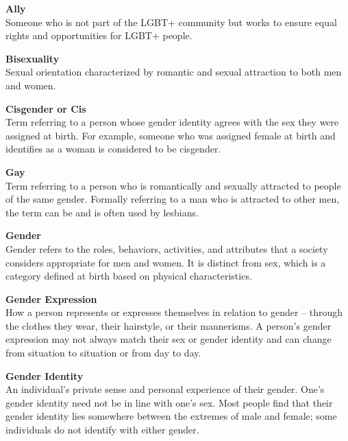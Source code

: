 \begin{titlepage}
\noindent\textbf{Ally}\\
Someone who is not part of the LGBT+ community but works to ensure equal rights and opportunities for LGBT+ people.\vspace*{\baselineskip}


\noindent\textbf{Bisexuality}\\
Sexual orientation characterized by romantic and sexual attraction to both men and women.\vspace*{\baselineskip}

\noindent\textbf{Cisgender or Cis}\\
Term referring to a person whose gender identity agrees with the sex they were assigned at birth.  For example, someone who was assigned female at birth and identifies as a woman is considered to be cisgender.\vspace*{\baselineskip}

\noindent\textbf{Gay}\\
Term referring to a person who is romantically and sexually attracted to people of the same gender.  Formally referring to a man who is attracted to other men, the term can be and is often used by lesbians. \vspace*{\baselineskip}

\noindent\textbf{Gender}\\
Gender refers to the roles, behaviors, activities, and attributes that a society considers appropriate for men and women. It is distinct from {sex,} which is a category defined at birth based on physical characteristics. \vspace*{\baselineskip}

\noindent\textbf{Gender Expression}\\
How a person represents or expresses themselves in relation to gender -- through the clothes they wear, their hairstyle, or their mannerisms. A person's gender expression may not always match their sex or gender identity and can change from situation to situation or from day to day. \vspace*{\baselineskip}

\noindent\textbf{Gender Identity}\\
An individual's private sense and personal experience of their gender. One's gender identity need not be in line with one's sex. Most people find that their gender identity lies somewhere between the extremes of male and female; some individuals do not identify with either gender. \vspace*{\baselineskip}


\end{titlepage}

